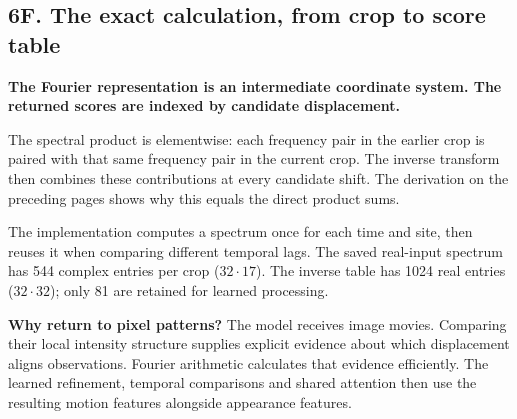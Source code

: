\documentclass[11pt,letterpaper]{article}
\begin{document}
\clearpage
\subsection*{6F. The exact calculation, from crop to score table}
\textbf{The Fourier representation is an intermediate coordinate system. The returned scores are indexed by candidate displacement.}

\begin{center}\end{center}

The spectral product is elementwise: each frequency pair in the earlier crop is paired with that same frequency pair in the current crop. The inverse transform then combines these contributions at every candidate shift. The derivation on the preceding pages shows why this equals the direct product sums.

The implementation computes a spectrum once for each time and site, then reuses it when comparing different temporal lags. The saved real-input spectrum has 544 complex entries per crop ($32\cdot17$). The inverse table has 1024 real entries ($32\cdot32$); only 81 are retained for learned processing.

\textbf{Why return to pixel patterns?} The model receives image movies. Comparing their local intensity structure supplies explicit evidence about which displacement aligns observations. Fourier arithmetic calculates that evidence efficiently. The learned refinement, temporal comparisons and shared attention then use the resulting motion features alongside appearance features.
\end{document}
